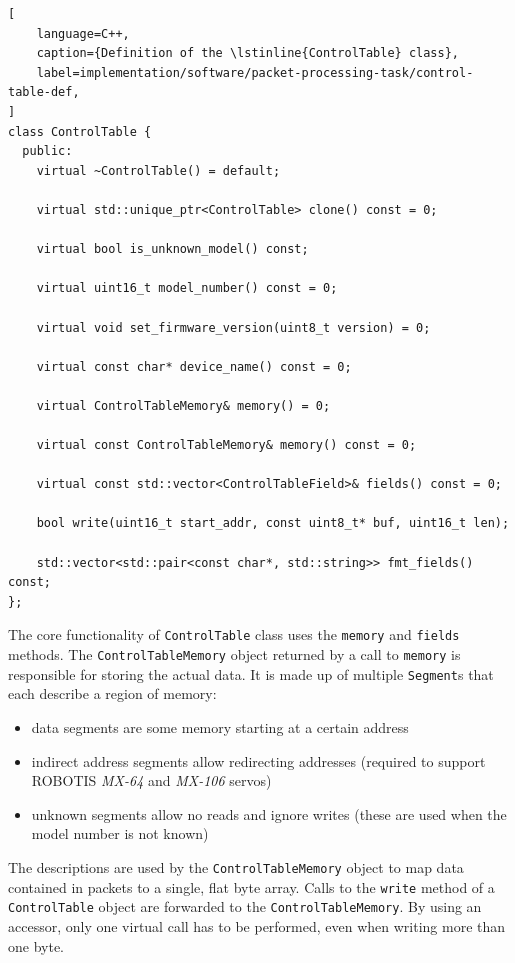 \begin{lstlisting}[
    language=C++,
    caption={Definition of the \lstinline{ControlTable} class},
    label=implementation/software/packet-processing-task/control-table-def,
]
class ControlTable {
  public:
    virtual ~ControlTable() = default;

    virtual std::unique_ptr<ControlTable> clone() const = 0;

    virtual bool is_unknown_model() const;

    virtual uint16_t model_number() const = 0;

    virtual void set_firmware_version(uint8_t version) = 0;

    virtual const char* device_name() const = 0;

    virtual ControlTableMemory& memory() = 0;

    virtual const ControlTableMemory& memory() const = 0;

    virtual const std::vector<ControlTableField>& fields() const = 0;

    bool write(uint16_t start_addr, const uint8_t* buf, uint16_t len);

    std::vector<std::pair<const char*, std::string>> fmt_fields() const;
};
\end{lstlisting}

The core functionality of \lstinline{ControlTable} class uses the \lstinline{memory} and
\lstinline{fields} methods. The \lstinline{ControlTableMemory} object returned by a call to
\lstinline{memory} is responsible for storing the actual data. It is made up of multiple
\lstinline{Segment}s that each describe a region of memory:

\begin{itemize}
    \item data segments are some memory starting at a certain address
    \item indirect address segments allow redirecting addresses (required to support ROBOTIS
          \textit{MX-64} and \textit{MX-106} servos)
    \item unknown segments allow no reads and ignore writes (these are used when the model number
          is not known)
\end{itemize}

The descriptions are used by the \lstinline{ControlTableMemory} object to map data contained in
packets to a single, flat byte array. Calls to the \lstinline{write} method of a \lstinline{ControlTable}
object are forwarded to the \lstinline{ControlTableMemory}. By using an accessor, only one virtual
call has to be performed, even when writing more than one byte.

